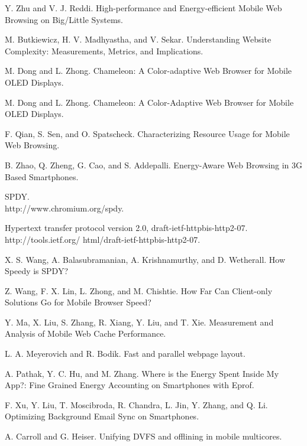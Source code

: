 \documentclass{sig-alternate-05-2015}
\begin{document}
\begin{thebibliography}{1}
	\newblock Y. Zhu and V. J. Reddi. High-performance and Energy-efficient Mobile Web Browsing on Big/Little Systems.
	\newblock {}
	
	\newblock M. Butkiewicz, H. V. Madhyastha, and V. Sekar. Understanding Website Complexity: Measurements, Metrics, and Implications.
	\newblock {}
	
	\newblock M. Dong and L. Zhong. Chameleon: A Color-adaptive Web Browser for Mobile OLED Displays.
	\newblock {}
	
	\newblock M. Dong and L. Zhong. Chameleon: A Color-Adaptive Web Browser for Mobile OLED Displays.
	\newblock {}
	
	\newblock F. Qian, S. Sen, and O. Spatscheck. Characterizing Resource Usage for Mobile Web Browsing.
	\newblock {}
	
	\newblock B. Zhao, Q. Zheng, G. Cao, and S. Addepalli. Energy-Aware Web Browsing in 3G Based Smartphones.
	\newblock {}
	
	\newblock SPDY. \\
	\newblock http://www.chromium.org/spdy.
	
	\newblock Hypertext transfer protocol version 2.0, draft-ietf-httpbis-http2-07.
	\newblock http://tools.ietf.org/ html/draft-ietf-httpbis-http2-07.
	
	\newblock X. S. Wang, A. Balasubramanian, A. Krishnamurthy, and D. Wetherall. How Speedy is SPDY?
	\newblock {}
	
	\newblock Z. Wang, F. X. Lin, L. Zhong, and M. Chishtie. How Far Can Client-only Solutions Go for Mobile Browser Speed?
	\newblock {}
	
	\newblock Y. Ma, X. Liu, S. Zhang, R. Xiang, Y. Liu, and T. Xie. Measurement and Analysis of Mobile Web Cache Performance.
	\newblock {}
	
	\newblock L. A. Meyerovich and R. Bodik. Fast and parallel webpage layout.
	\newblock {}
	
	\newblock A. Pathak, Y. C. Hu, and M. Zhang. Where is the Energy Spent Inside My App?: Fine Grained Energy Accounting on Smartphones with Eprof.
	\newblock {}
	
	\newblock F. Xu, Y. Liu, T. Moscibroda, R. Chandra, L. Jin, Y. Zhang, and Q. Li. Optimizing Background Email Sync on Smartphones.
	\newblock {}
	
	\newblock A. Carroll and G. Heiser. Unifying DVFS and offlining in mobile multicores.
	\newblock {}
	
\end{thebibliography}
\end{document}
